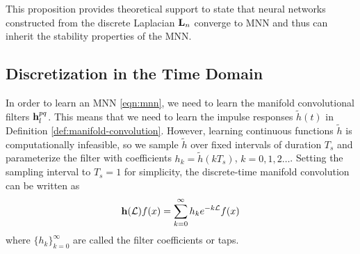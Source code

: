 
This proposition provides theoretical support to state that neural networks constructed from the discrete Laplacian ${\mathbf L}_n$ converge to MNN and thus can inherit the stability properties of the MNN.


\subsection{Discretization in the Time Domain}

In order to learn an MNN \eqref{eqn:mnn}, we need to learn the manifold convolutional filters ${\mathbf h}_l^{pq}$. This means that we need to learn the impulse responses $\tilde{h}(t)$ in Definition \ref{def:manifold-convolution}. However, learning continuous functions $\tilde{h}$ is computationally infeasible,
so we sample $\tilde{h}$ over fixed intervals of duration $T_s$ and parameterize the filter with coefficients $h_k = \tilde{h}(k T_s)$, $k =0 ,1, 2\dots$. Setting the sampling interval to $T_s=1$ for simplicity, the discrete-time manifold convolution can be written as
\begin{equation}
\label{eqn:manifold_convolution_discrete}
    {\ensuremath{\mathbf h}}({\mathcal L}) f(x)= \sum_{k=0}^{\infty} h_k e^{-k{\mathcal L}}f(x) 
\end{equation}
where $\{h_k\}_{k=0}^\infty$ are called the filter coefficients or taps.

